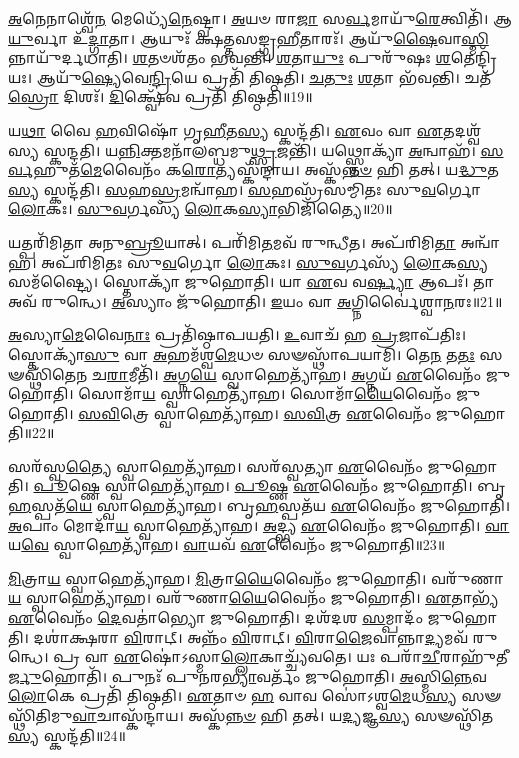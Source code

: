 \-\ul{𑌅}\-𑌨𑍇𑌨𑌾𑌶𑍍𑌵𑍇᳴\-\ul{𑌨} 𑌮𑍇𑌧𑍍𑌯𑍇᳴\-\ul{𑌨𑍇}\-𑌷𑍍𑌟𑍍𑌵𑌾।
\-\ul{𑌅}\-𑌯𑍞 𑌰𑌾\-\ul{𑌜𑌾} 𑌸\-\ul{𑌰𑍍𑌵}\-𑌮𑌾𑌯𑍁᳴\-\ul{𑌰𑍇}\-𑌤𑍍𑌵𑌿𑌤𑌿᳴।
𑌆\-\ul{𑌯𑍁}\-𑌰𑍍𑌵𑌾 𑌉᳴\-\ul{𑌦𑍍𑌗𑌾}\-𑌤𑌾।
𑌆𑌯𑍁𑌃᳴ 𑌕𑍍𑌷𑌤𑍍𑌤𑌸𑌙𑍍𑌗𑍍𑌰\-\ul{𑌹𑍀}\-𑌤𑌾𑌰𑌃᳴।
𑌆𑌯𑍁᳴\-\ul{𑌷𑍈}\-𑌵𑌾\-\ul{𑌸𑍍𑌮𑌿}\-𑌨𑍍𑌨𑌾𑌯𑍁᳴𑌰𑍍𑌦\-𑌧𑌾𑌤𑌿।
\-\ul{𑌶}\-𑌤𑍞𑌶᳴𑌤𑌂 𑌭𑌵𑌨𑍍𑌤𑌿।
\-\ul{𑌶}\-𑌤𑌾\-\ul{𑌯𑍁𑌃} 𑌪𑍁𑌰𑍁᳴𑌷𑌃 \ul{𑌶}\-𑌤𑍇𑌨𑍍𑌦𑍍𑌰𑌿᳴𑌯𑌃।
𑌆𑌯𑍁᳴\-\ul{𑌷𑍍𑌯𑍇}\-𑌵𑍇\-\ul{𑌨𑍍𑌦𑍍𑌰𑌿}\-𑌯𑍇 𑌪𑍍𑌰𑌤𑌿᳴ 𑌤𑌿𑌷𑍍𑌠𑌤𑌿।
\-\ul{𑌚}\-\-\ul{𑌤𑍁𑌃} \ul{𑌶}\-𑌤𑌾 𑌭᳴𑌵𑌨𑍍𑌤𑌿।
𑌚𑌤᳴\-\ul{𑌸𑍍𑌰𑍋} 𑌦𑌿𑌶𑌃᳴।
\-\ul{𑌦𑌿}\-𑌕𑍍𑌷𑍍𑌵𑍇᳴𑌵 𑌪𑍍𑌰𑌤𑌿᳴ 𑌤𑌿𑌷𑍍𑌠𑌤𑌿॥19॥\anuvakamend[\-\ul{𑌬𑍍𑌰}\-𑌹𑍍𑌮𑌾 \ul{𑌵𑌿}\-𑌶 𑌉᳴𑌕𑍍𑌷\-\ul{𑌤𑌿} 𑌦𑌿\-\ul{𑌶} 𑌏𑌕𑌂᳴ 𑌚]

𑌯\-\ul{𑌥𑌾} 𑌵𑍈 \ul{𑌹}\-𑌵𑌿𑌷𑍋᳴ 𑌗𑍃\-\ul{𑌹𑍀}\-𑌤\-\ul{𑌸𑍍𑌯} 𑌸𑍍𑌕𑌨𑍍𑌦᳴𑌤𑌿।
\-\ul{𑌏}\-𑌵𑌂 𑌵𑌾 \ul{𑌏}\-𑌤𑌦𑌶𑍍𑌵᳴𑌸𑍍𑌯 𑌸𑍍𑌕𑌨𑍍𑌦𑌤𑌿।
𑌯\-\ul{𑌨𑍍𑌨𑌿}\-𑌕𑍍𑌤𑌮𑌨𑌾᳴𑌲𑌬𑍍𑌧𑌮𑍁\-\ul{𑌥𑍍𑌸𑍃}\-𑌜𑌨𑍍𑌤𑌿᳴।
𑌯𑌥𑍍𑌸𑍍𑌤𑍋𑌕𑍍𑌯𑌾᳴ \ul{𑌅}\-𑌨𑍍𑌵𑌾𑌹᳴।
\-\ul{𑌸}\-\-\ul{𑌰𑍍𑌵}\-𑌹𑍁𑌤᳴\-\ul{𑌮𑍇}\-𑌵𑍈𑌨𑌂᳴ 𑌕\-\ul{𑌰𑍋}\-𑌤𑍍𑌯𑌸𑍍𑌕᳴𑌨𑍍𑌦𑌾𑌯।
𑌅𑌸𑍍𑌕᳴\-\ul{𑌨𑍍𑌨}\-\-\ul{𑍞} 𑌹𑌿 𑌤𑌤𑍍।
𑌯\-\ul{𑌦𑍍𑌧𑍁}\-𑌤\-\ul{𑌸𑍍𑌯} 𑌸𑍍𑌕𑌨𑍍𑌦᳴𑌤𑌿।
\-\ul{𑌸}\-𑌹\-\ul{𑌸𑍍𑌰}\-𑌮𑌨𑍍𑌵𑌾᳴𑌹।
\-\ul{𑌸}\-𑌹𑌸𑍍𑌰᳴𑌸𑌮𑍍𑌮𑌿𑌤𑌃 𑌸𑍁\-\ul{𑌵}\-𑌰𑍍𑌗𑍋 \ul{𑌲𑍋}\-𑌕𑌃।
\-\ul{𑌸𑍁}\-\-\ul{𑌵}\-𑌰𑍍𑌗𑌸𑍍𑌯᳴ \ul{𑌲𑍋}\-𑌕\-\ul{𑌸𑍍𑌯𑌾}\-𑌭𑌿𑌜𑌿᳴𑌤𑍍𑌯𑍈॥20॥

𑌯𑌤𑍍𑌪𑌰𑌿᳴𑌮𑌿𑌤𑌾 𑌅𑌨𑍁\-\ul{𑌬𑍍𑌰𑍂}\-𑌯𑌾𑌤𑍍।
𑌪𑌰𑌿᳴𑌮𑌿\-\ul{𑌤}\-𑌮𑌵᳴ 𑌰𑍁𑌨𑍍𑌧𑍀𑌤।
𑌅𑌪᳴𑌰𑌿𑌮𑌿\-\ul{𑌤𑌾} 𑌅𑌨𑍍𑌵𑌾᳴𑌹।
𑌅𑌪᳴𑌰𑌿𑌮𑌿𑌤𑌃 𑌸𑍁\-\ul{𑌵}\-𑌰𑍍𑌗𑍋 \ul{𑌲𑍋}\-𑌕𑌃।
\-\ul{𑌸𑍁}\-\-\ul{𑌵}\-𑌰𑍍𑌗𑌸𑍍𑌯᳴ \ul{𑌲𑍋}\-𑌕\-\ul{𑌸𑍍𑌯} 𑌸𑌮᳴𑌷𑍍𑌟𑍍𑌯𑍈।
𑌸𑍍𑌤𑍋𑌕𑍍𑌯𑌾᳴ 𑌜𑍁𑌹𑍋𑌤𑌿।
𑌯𑌾 \ul{𑌏}\-𑌵 𑌵\-\ul{𑌰𑍍𑌷𑍍𑌯𑌾} 𑌆𑌪𑌃᳴।
𑌤𑌾 𑌅𑌵᳴ 𑌰𑍁𑌨𑍍𑌧𑍇।
\-\ul{𑌅}\-𑌸𑍍𑌯𑌾𑌂 𑌜𑍁᳴𑌹𑍋𑌤𑌿।
\-\ul{𑌇}\-𑌯𑌂 𑌵𑌾 \ul{𑌅}\-𑌗𑍍𑌨𑌿𑌰𑍍𑌵𑍈॑𑌶𑍍𑌵𑌾\-\ul{𑌨}\-𑌰𑌃॥21॥

\-\ul{𑌅}\-𑌸𑍍𑌯𑌾\-\ul{𑌮𑍇}\-𑌵𑍈\-\ul{𑌨𑌾𑌃} 𑌪𑍍𑌰𑌤𑌿᳴\-𑌷𑍍𑌠𑌾𑌪𑌯𑌤𑌿।
\-\ul{𑌉}\-𑌵𑌾𑌚᳴ 𑌹 \ul{𑌪𑍍𑌰}\-𑌜𑌾\-𑌪᳴𑌤𑌿𑌃।
𑌸𑍍𑌤𑍋𑌕𑍍𑌯𑌾᳴\-\ul{𑌸𑍁} 𑌵𑌾 \ul{𑌅}\-𑌹𑌮᳴𑌶𑍍𑌵\-\ul{𑌮𑍇}\-𑌧𑍞 𑌸𑍟𑌸𑍍𑌥𑌾᳴𑌪𑌯𑌾𑌮𑌿।
𑌤𑍇\-\ul{𑌨} 𑌤\-\ul{𑌤𑌃} 𑌸𑍟𑌸𑍍𑌥𑌿᳴𑌤𑍇𑌨 𑌚\-\ul{𑌰𑌾}\-𑌮𑍀𑌤𑌿᳴।
\-\ul{𑌅}\-𑌗𑍍𑌨\-\ul{𑌯𑍇} 𑌸𑍍𑌵𑌾𑌹𑍇𑌤𑍍𑌯𑌾᳴𑌹।
\-\ul{𑌅}\-𑌗𑍍𑌨𑌯᳴ \ul{𑌏}\-𑌵𑍈𑌨𑌂᳴ 𑌜𑍁𑌹𑍋𑌤𑌿।
𑌸𑍋𑌮𑌾᳴\-\ul{𑌯} 𑌸𑍍𑌵𑌾𑌹𑍇𑌤𑍍𑌯𑌾᳴𑌹।
𑌸𑍋𑌮𑌾᳴\-\ul{𑌯𑍈}\-𑌵𑍈𑌨𑌂᳴ 𑌜𑍁𑌹𑍋𑌤𑌿।
\-\ul{𑌸}\-\-\ul{𑌵𑌿}\-𑌤𑍍𑌰𑍇 𑌸𑍍𑌵𑌾𑌹𑍇𑌤𑍍𑌯𑌾᳴𑌹।
\-\ul{𑌸}\-\-\ul{𑌵𑌿}\-𑌤𑍍𑌰 \ul{𑌏}\-𑌵𑍈𑌨𑌂᳴ 𑌜𑍁𑌹𑍋𑌤𑌿॥22॥

𑌸𑌰᳴𑌸𑍍𑌵\-\ul{𑌤𑍍𑌯𑍈} 𑌸𑍍𑌵𑌾𑌹𑍇𑌤𑍍𑌯𑌾᳴𑌹।
𑌸𑌰᳴𑌸𑍍𑌵𑌤𑍍𑌯𑌾 \ul{𑌏}\-𑌵𑍈𑌨𑌂᳴ 𑌜𑍁𑌹𑍋𑌤𑌿।
\-\ul{𑌪𑍂}\-𑌷𑍍𑌣𑍇 𑌸𑍍𑌵𑌾𑌹𑍇𑌤𑍍𑌯𑌾᳴𑌹।
\-\ul{𑌪𑍂}\-𑌷𑍍𑌣 \ul{𑌏}\-𑌵𑍈𑌨𑌂᳴ 𑌜𑍁𑌹𑍋𑌤𑌿।
𑌬𑍃\-\ul{𑌹}\-𑌸𑍍𑌪𑌤᳴\-\ul{𑌯𑍇} 𑌸𑍍𑌵𑌾𑌹𑍇𑌤𑍍𑌯𑌾᳴𑌹।
𑌬𑍃\-\ul{𑌹}\-𑌸𑍍𑌪𑌤᳴𑌯 \ul{𑌏}\-𑌵𑍈𑌨𑌂᳴ 𑌜𑍁𑌹𑍋𑌤𑌿।
\-\ul{𑌅}\-𑌪𑌾𑌂 𑌮𑍋𑌦𑌾᳴\-\ul{𑌯} 𑌸𑍍𑌵𑌾𑌹𑍇𑌤𑍍𑌯𑌾᳴𑌹।
\-\ul{𑌅}\-𑌦𑍍𑌭𑍍𑌯 \ul{𑌏}\-𑌵𑍈𑌨𑌂᳴ 𑌜𑍁𑌹𑍋𑌤𑌿।
\-\ul{𑌵𑌾}\-𑌯\-\ul{𑌵𑍇} 𑌸𑍍𑌵𑌾𑌹𑍇𑌤𑍍𑌯𑌾᳴𑌹।
\-\ul{𑌵𑌾}\-𑌯𑌵᳴ \ul{𑌏}\-𑌵𑍈𑌨𑌂᳴ 𑌜𑍁𑌹𑍋𑌤𑌿॥23॥

\-\ul{𑌮𑌿}\-𑌤𑍍𑌰𑌾\-\ul{𑌯} 𑌸𑍍𑌵𑌾𑌹𑍇𑌤𑍍𑌯𑌾᳴𑌹।
\-\ul{𑌮𑌿}\-𑌤𑍍𑌰𑌾\-\ul{𑌯𑍈}\-𑌵𑍈𑌨𑌂᳴ 𑌜𑍁𑌹𑍋𑌤𑌿।
𑌵𑌰𑍁᳴𑌣𑌾\-\ul{𑌯} 𑌸𑍍𑌵𑌾𑌹𑍇𑌤𑍍𑌯𑌾᳴𑌹।
𑌵𑌰𑍁᳴𑌣𑌾\-\ul{𑌯𑍈}\-𑌵𑍈𑌨𑌂᳴ 𑌜𑍁𑌹𑍋𑌤𑌿।
\-\ul{𑌏}\-𑌤𑌾𑌭𑍍𑌯᳴ \ul{𑌏}\-𑌵𑍈𑌨𑌂᳴ \ul{𑌦𑍇}\-𑌵𑌤𑌾॑𑌭𑍍𑌯𑍋 𑌜𑍁𑌹𑍋𑌤𑌿।
𑌦𑌶᳴𑌦𑌶 \ul{𑌸}\-𑌮𑍍𑌪𑌾𑌦𑌂᳴ 𑌜𑍁𑌹𑍋𑌤𑌿।
𑌦𑌶𑌾॑𑌕𑍍𑌷𑌰𑌾 \ul{𑌵𑌿}\-𑌰𑌾𑌟𑍍।
𑌅𑌨𑍍𑌨𑌂᳴ \ul{𑌵𑌿}\-𑌰𑌾𑌟𑍍।
\-\ul{𑌵𑌿}\-𑌰𑌾\-\ul{𑌜𑍈}\-𑌵𑌾𑌨𑍍𑌨𑌾\-\ul{𑌦𑍍𑌯}\-𑌮𑌵᳴ 𑌰𑍁𑌨𑍍𑌧𑍇।
𑌪𑍍𑌰 𑌵𑌾 \ul{𑌏}\-𑌷𑍋॑\-𑌽𑌸𑍍𑌮𑌾\-\ul{𑌲𑍍𑌲𑍋}\-𑌕𑌾𑌚𑍍𑌚𑍍𑌯᳴𑌵𑌤𑍇।
𑌯𑌃 𑌪𑌰𑌾᳴\-\ul{𑌚𑍀}\-𑌰𑌾𑌹𑍁᳴𑌤𑍀\-\ul{𑌰𑍍𑌜𑍁}\-𑌹𑍋𑌤𑌿᳴।
𑌪𑍁𑌨𑌃᳴ 𑌪𑍁𑌨𑌰\-\ul{𑌭𑍍𑌯𑌾}\-𑌵𑌰𑍍𑌤𑌂᳴ 𑌜𑍁𑌹𑍋𑌤𑌿।
\-\ul{𑌅}\-𑌸𑍍𑌮𑌿\-\ul{𑌨𑍍𑌨𑍇}\-𑌵 \ul{𑌲𑍋}\-𑌕𑍇 𑌪𑍍𑌰𑌤𑌿᳴ 𑌤𑌿𑌷𑍍𑌠𑌤𑌿।
\-\ul{𑌏}\-𑌤𑌾𑍞 \ul{𑌹} 𑌵𑌾𑌵 𑌸𑍋॑\-𑌽𑌶𑍍𑌵\-\ul{𑌮𑍇}\-𑌧\-\ul{𑌸𑍍𑌯} 𑌸𑍟𑌸𑍍𑌥𑌿᳴𑌤𑌿𑌮𑍁\-\ul{𑌵𑌾}\-𑌚𑌾𑌸𑍍𑌕᳴𑌨𑍍𑌦𑌾𑌯।
𑌅𑌸𑍍𑌕᳴\-\ul{𑌨𑍍𑌨}\-\-\ul{𑍞} 𑌹𑌿 𑌤𑌤𑍍।
𑌯\-\ul{𑌦𑍍𑌯}\-𑌜𑍍𑌞\-\ul{𑌸𑍍𑌯} 𑌸𑍟𑌸𑍍𑌥𑌿᳴𑌤\-\ul{𑌸𑍍𑌯} 𑌸𑍍𑌕𑌨𑍍𑌦᳴𑌤𑌿॥24॥\anuvakamend[\-\ul{𑌅}\-𑌭𑌿𑌜𑌿᳴𑌤𑍍𑌯𑍈 𑌵𑍈𑌶𑍍𑌵𑌾\-\ul{𑌨}\-𑌰𑌃 𑌸᳴\-\ul{𑌵𑌿}\-𑌤𑍍𑌰 \ul{𑌏}\-𑌵𑍈𑌨𑌂᳴ 𑌜𑍁𑌹𑍋𑌤𑌿 \ul{𑌵𑌾}\-𑌯𑌵᳴ \ul{𑌏}\-𑌵𑍈𑌨𑌂᳴ 𑌜𑍁𑌹𑍋𑌤𑌿 𑌚𑍍𑌯𑌵\-\ul{𑌤𑍇} 𑌷𑌟𑍍 𑌚᳴]

